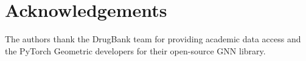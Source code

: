 \documentclass[10pt,twocolumn]{article}
\begin{document}
\section*{Acknowledgements}
The authors thank the DrugBank team for providing academic data access and the
PyTorch Geometric developers for their open-source GNN library.


\onecolumn

\end{document}
